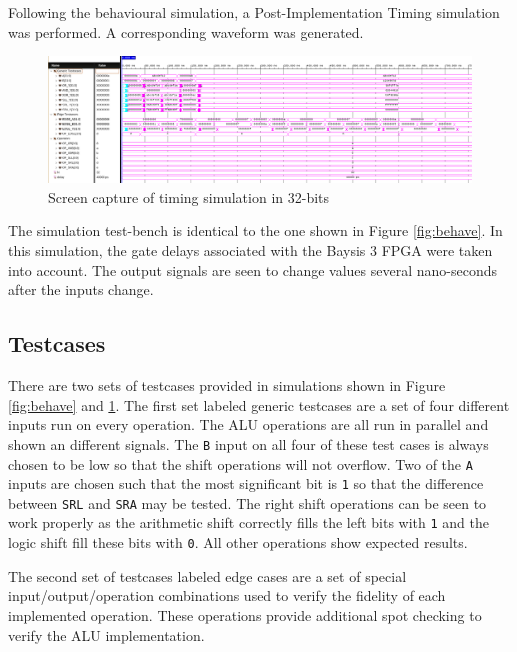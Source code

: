 \documentclass[CMPE]{../KGCOEReport}
\def\code#1{\texttt{#1}}
\begin{document}
    \pagebreak

    Following the behavioural simulation, a Post-Implementation Timing simulation was performed.
    A corresponding waveform was generated.

    \begin{figure}[h!]
        \centering
        \includegraphics[width=\textwidth]{img/timing_32}
        \caption{Screen capture of timing simulation in 32-bits}
        \label{fig:timing}
    \end{figure}

    The simulation test-bench is identical to the one shown in Figure \ref{fig:behave}.
    In this simulation, the gate delays associated with the Baysis 3 FPGA were taken into account.
    The output signals are seen to change values several nano-seconds after the inputs change.

    \subsection*{Testcases}
    There are two sets of testcases provided in simulations shown in Figure \ref{fig:behave} and \ref{fig:timing}.
    The first set labeled generic testcases are a set of four different inputs run on every operation.
    The ALU operations are all run in parallel and shown an different signals.
    The \code{B} input on all four of these test cases is always chosen to be low so that the shift operations
    will not overflow.
    Two of the \code{A} inputs are chosen such that the most significant bit is \code{1} so that the difference between
    \code{SRL} and \code{SRA} may be tested.
    The right shift operations can be seen to work properly as the arithmetic shift correctly fills the left bits with
    \code{1} and the logic shift fill these bits with \code{0}.
    All other operations show expected results.

    The second set of testcases labeled edge cases are a set of special input/output/operation combinations used to
    verify the fidelity of each implemented operation.
    These operations provide additional spot checking to verify the ALU implementation.
\end{document}
